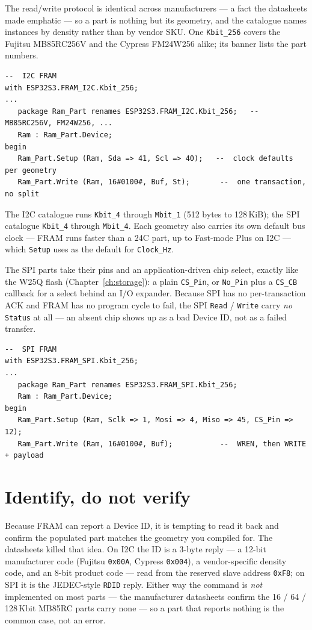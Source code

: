 The read/write protocol is identical across manufacturers --- a fact the
datasheets made emphatic --- so a part is nothing but its geometry, and the
catalogue names instances by density rather than by vendor SKU. One
\texttt{Kbit\_256} covers the Fujitsu MB85RC256V and the Cypress FM24W256 alike;
its banner lists the part numbers.

\begin{lstlisting}
--  I2C FRAM
with ESP32S3.FRAM_I2C.Kbit_256;
...
   package Ram_Part renames ESP32S3.FRAM_I2C.Kbit_256;   --  MB85RC256V, FM24W256, ...
   Ram : Ram_Part.Device;
begin
   Ram_Part.Setup (Ram, Sda => 41, Scl => 40);   --  clock defaults per geometry
   Ram_Part.Write (Ram, 16#0100#, Buf, St);       --  one transaction, no split
\end{lstlisting}

The I2C catalogue runs \texttt{Kbit\_4} through \texttt{Mbit\_1} (512 bytes to
128\,KiB); the SPI catalogue \texttt{Kbit\_4} through \texttt{Mbit\_4}. Each
geometry also carries its own default bus clock --- FRAM runs faster than a 24C
part, up to Fast-mode Plus on I2C --- which \texttt{Setup} uses as the default for
\texttt{Clock\_Hz}.

The SPI parts take their pins and an application-driven chip select, exactly like
the W25Q flash (Chapter~\ref{ch:storage}): a plain \texttt{CS\_Pin}, or
\texttt{No\_Pin} plus a \texttt{CS\_CB} callback for a select behind an I/O
expander. Because SPI has no per-transaction ACK and FRAM has no program cycle to
fail, the SPI \texttt{Read} / \texttt{Write} carry \emph{no} \texttt{Status} at
all --- an absent chip shows up as a bad Device ID, not as a failed transfer.

\begin{lstlisting}
--  SPI FRAM
with ESP32S3.FRAM_SPI.Kbit_256;
...
   package Ram_Part renames ESP32S3.FRAM_SPI.Kbit_256;
   Ram : Ram_Part.Device;
begin
   Ram_Part.Setup (Ram, Sclk => 1, Mosi => 4, Miso => 45, CS_Pin => 12);
   Ram_Part.Write (Ram, 16#0100#, Buf);           --  WREN, then WRITE + payload
\end{lstlisting}

\section{Identify, do not verify}

Because FRAM can report a Device ID, it is tempting to read it back and confirm the
populated part matches the geometry you compiled for. The datasheets killed that
idea. On I2C the ID is a 3-byte reply --- a 12-bit manufacturer code (Fujitsu
\texttt{0x00A}, Cypress \texttt{0x004}), a vendor-specific density code, and an
8-bit product code --- read from the reserved slave address \texttt{0xF8}; on SPI
it is the JEDEC-style \texttt{RDID} reply. Either way the command is \emph{not}
implemented on most parts --- the manufacturer datasheets confirm the 16 / 64 /
128\,Kbit MB85RC parts carry none --- so a part that reports nothing is the common
case, not an error.

